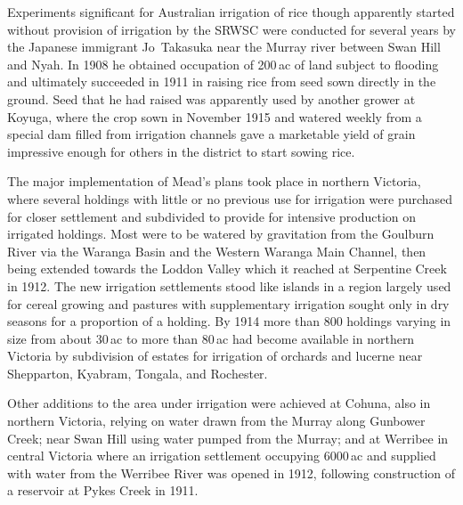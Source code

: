 Experiments significant for Australian irrigation of rice though
apparently started without provision of irrigation by the SRWSC were
conducted for several years by the Japanese immigrant Jo~Takasuka near
the Murray river between Swan Hill and Nyah.  In 1908 he obtained
occupation of 200\,ac of land subject to flooding and ultimately
succeeded in 1911 in raising rice from seed sown directly in the
ground.  Seed that he
had raised was apparently used by another grower at Koyuga, where the
crop sown in November 1915 and watered weekly from a special dam
filled from irrigation channels gave a marketable yield of grain
impressive enough for others in the district to start sowing
rice.

The major implementation of Mead's plans took place in northern
Victoria, where several holdings with little or no previous use for
irrigation were purchased for closer settlement and subdivided to
provide for intensive production on irrigated holdings.  Most were to
be watered by gravitation from the Goulburn River via the Waranga
Basin and the Western Waranga Main Channel, then being extended
towards the Loddon Valley which it reached at Serpentine Creek in
1912.  The new irrigation settlements
stood like islands in a region largely used for cereal growing and
pastures with supplementary irrigation sought only in dry seasons for
a proportion of a holding.  By 1914 more than 800 holdings varying in
size from about 30\,ac to more than 80\,ac had become available in
northern Victoria by subdivision of estates for irrigation of orchards
and lucerne near Shepparton, Kyabram, Tongala, and
Rochester.

Other additions to the area under irrigation were achieved at Cohuna,
also in northern Victoria, relying on water drawn from the Murray
along Gunbower Creek; near Swan Hill using water pumped from the
Murray; and at Werribee in central Victoria where an irrigation
settlement occupying 6000\,ac and supplied with water from the
Werribee River was opened in 1912, following construction of a
reservoir at Pykes Creek in 1911.


